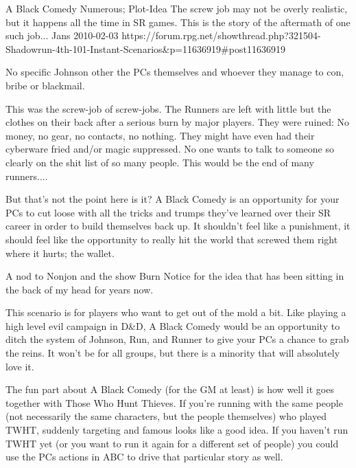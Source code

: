 \begin{scenario}{A Black Comedy}
	{Numerous; Plot-Idea}
	{The screw job may not be overly realistic, but it happens all the time in SR games. This is the story of the aftermath of one such job...}
	{Jans}
	{2010-02-03}
	{https://forum.rpg.net/showthread.php?321504-Shadowrun-4th-101-Instant-Scenarios\&p=11636919#post11636919}

  No specific Johnson other the PCs themselves and whoever they manage to con, bribe or blackmail.

\synopsis This was the screw-job of screw-jobs. The Runners are left with little but the clothes on their back after a serious burn by major players. They were ruined: No money, no gear, no contacts, no nothing. They might have even had their cyberware fried and/or magic suppressed. No one wants to talk to someone so clearly on the shit list of so many people. This would be the end of many runners....

But that's not the point here is it? A Black Comedy is an opportunity for your PCs to cut loose with all the tricks and trumps they've learned over their SR career in order to build themselves back up. It shouldn't feel like a punishment, it should feel like the opportunity to really hit the world that screwed them right where it hurts; the wallet.

\notes  A nod to Nonjon and the show Burn Notice for the idea that has been sitting in the back of my head for years now.

This scenario is for players who want to get out of the mold a bit. Like playing a high level evil campaign in D\&D, A Black Comedy would be an opportunity to ditch the system of Johnson, Run, and Runner to give your PCs a chance to grab the reins. It won't be for all groups, but there is a minority that will absolutely love it.

The fun part about A Black Comedy (for the GM at least) is how well it goes together with Those Who Hunt Thieves. If you're running with the same people (not necessarily the same characters, but the people themselves) who played TWHT, suddenly targeting and famous looks like a good idea. If you haven't run TWHT yet (or you want to run it again for a different set of people) you could use the PCs actions in ABC to drive that particular story as well. 

\end{scenario}